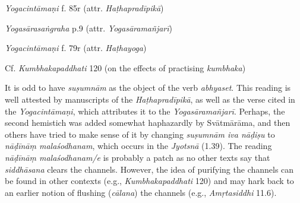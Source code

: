 \begin{ekdosis}

\begin{testimonia}[hp01_039]
\emph{Yogacintāmaṇi} f. 85r (attr. \emph{Haṭhapradīpikā})

\begin{versinnote}
\end{versinnote}

\emph{Yogasārasaṅgraha} p.9 (attr. \emph{Yogasāramañjarī})

\begin{versinnote}
\end{versinnote}

\emph{Yogacintāmaṇi} f. 79r (attr. \emph{Haṭhayoga})

\begin{versinnote}
\end{versinnote}

Cf. \emph{Kumbhakapaddhati} 120 (on the effects of practising \emph{kumbhaka})

\begin{versinnote}
\end{versinnote}

\end{testimonia}

\begin{philcomm}[hp01_039]
It is odd to have \emph{suṣumnām} as the object of the verb \emph{abhyaset}. This reading is well attested by manuscripts of the \emph{Haṭhapradīpikā}, as well as the verse cited in the \emph{Yogacintāmaṇi}, which attributes it to the \emph{Yogasāramañjarī}. Perhaps, the second hemistich was added somewhat haphazardly by Svātmārāma, and then others have tried to make sense of it by changing \emph{suṣumnām iva nāḍiṣu} to \emph{nāḍīnāṃ malaśodhanam}, which occurs in the \emph{Jyotsnā} (1.39). The reading \emph{nāḍīnāṃ malaśodhanam/e} is probably a patch as no other texts say that \emph{siddhāsana} clears the channels. However, the idea of purifying the channels can be found in other contexts (e.g., \emph{Kumbhakapaddhati} 120) and may hark back to an earlier notion of flushing (\emph{cālana}) the channels (e.g., \emph{Amṛtasiddhi} 11.6).


\end{philcomm}
\end{ekdosis}
